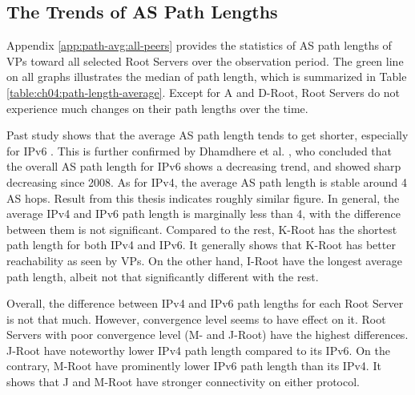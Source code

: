 

\subsection{The Trends of AS Path Lengths}
\label{ch04:evolution:as-path-length}
Appendix \ref{app:path-avg:all-peers} provides the statistics of AS path lengths of VPs toward all selected Root Servers over the observation period. The green line on all graphs illustrates the median of path length, which is summarized in Table \ref{table:ch04:path-length-average}. Except for A and D-Root, Root Servers do not experience much changes on their path lengths over the time. 

Past study shows that the average AS path length tends to get shorter, especially for IPv6  \cite{update}. This is further confirmed by Dhamdhere et al. \cite{Dhamdhere:2012:MDI:2398776.2398832}, who concluded that the overall AS path length for IPv6 shows a decreasing trend, and showed sharp decreasing since 2008. As for IPv4, the average AS path length is stable around 4 AS hops. Result from this thesis indicates roughly similar figure. In general, the average IPv4 and IPv6 path length is marginally less than 4, with the difference between them is not significant. Compared to the rest, K-Root has the shortest path length for both IPv4 and IPv6. It generally shows that K-Root has better reachability as seen by VPs. On the other hand, I-Root have the longest average path length, albeit not that significantly different with the rest. 

Overall, the difference between IPv4 and IPv6 path lengths for each Root Server is not that much. However, convergence level seems to have effect on it. Root Servers with poor convergence level (M- and J-Root) have the highest differences. J-Root have noteworthy lower IPv4 path length compared to its IPv6. On the contrary, M-Root have prominently lower IPv6 path length than its IPv4. It shows that J and M-Root have stronger connectivity on either protocol.

